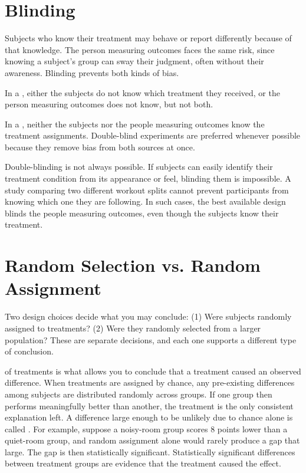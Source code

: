 \section{Blinding}

Subjects who know their treatment may behave or report differently because of that knowledge. The person measuring outcomes faces the same risk, since knowing a subject's group can sway their judgment, often without their awareness. Blinding prevents both kinds of bias.

In a , either the subjects do not 
know which treatment they received, or the person measuring outcomes does not know, but not both. 

In a , neither the subjects nor the people measuring outcomes know the treatment assignments. Double-blind experiments are preferred whenever possible because they remove bias from both sources at once.

Double-blinding is not always possible. 
If subjects can easily identify their treatment condition from its appearance or 
feel, blinding them is impossible. A study comparing two different workout splits cannot prevent 
participants from knowing which one they are following. In such cases, the best available design blinds the people measuring outcomes, even though the subjects know their treatment.

\section{Random Selection vs. Random Assignment}

Two design choices decide what you may conclude: (1) Were subjects randomly assigned to treatments? (2) Were they randomly selected from a larger population? These are separate decisions, and each one supports a different type of conclusion.

 of treatments is what allows you to conclude that a
 treatment caused an observed difference. When treatments are assigned by chance, any pre-existing differences 
 among subjects are distributed randomly across groups. If one group then performs meaningfully better than another, the treatment is the only consistent explanation left. A difference large enough to be unlikely 
 due to chance alone is called . 
 For example, suppose a noisy-room group scores 8 points lower than a quiet-room group, and random assignment alone would rarely produce a gap that large. The gap is then statistically significant. Statistically significant differences between treatment groups are evidence that the treatment caused the effect.

